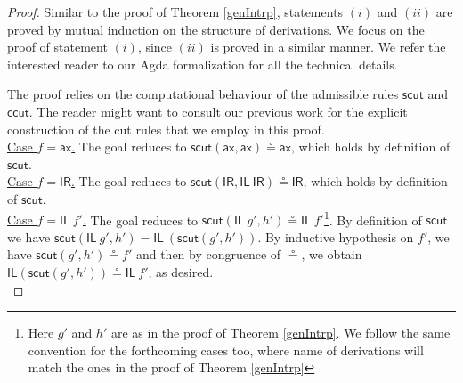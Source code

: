 \documentclass[sn-mathphys-num]{sn-jnl}%
\newcommand{\vd}{\vdash}
\newcommand{\unitl}{\mathsf{IL}}
\newcommand{\unitr}{\mathsf{IR}}
\newcommand{\ax}{\mathsf{ax}}
\newcommand{\mf}[1]{\mathsf{#1}}
\newcommand{\scut}[2]{\mf{scut} (#1 , #2)}
\theoremstyle{thmstyleone}%
\theoremstyle{thmstyletwo}%
\theoremstyle{thmstylethree}%
\begin{document}
\cutIntrp
\begin{proof}
  Similar to the proof of Theorem \ref{genIntrp}, statements $(i)$ and $(ii)$ are proved by mutual induction on the structure of derivations.
  We focus on the proof of statement $(i)$, since $(ii)$ is proved in a similar manner. We refer the interested reader to our Agda formalization for all the technical details.

  The proof relies on the computational behaviour of the admissible rules $\mf{scut}$ and $\mf{ccut}$. The reader might want to consult our previous work \cite{uustalu:sequent:2021,wan2024} for the explicit construction of the cut rules that we employ in this proof. \\
  \underline{Case $f = \ax$.} The goal reduces to $\mf{scut} (\ax , \ax) \circeq \ax$, which holds by definition of $\mf{scut}$.
  \\
  \underline{Case $f = \unitr$.} The goal reduces to $\mf{scut} (\unitr , \unitl\  \unitr) \circeq \unitr$, which holds by definition of $\mf{scut}$. %
  \\
  \underline{Case $f = \unitl \ f'$.} The goal reduces to $\mf{scut} (\unitl \ g', h') \circeq \unitl\ f'$\footnote{Here $g'$ and $h'$ are as in the proof of Theorem \ref{genIntrp}. We follow the same convention for the forthcoming cases too, where name of derivations will match the ones in the proof of Theorem \ref{genIntrp}}. By definition of $\mf{scut}$ we have $\mf{scut} (\unitl \ g', h') = \unitl\ (\mf{scut} (g', h'))$. By inductive hypothesis on $f'$, we have $\mf{scut} (g' , h') \circeq f'$ and then by congruence of $\circeq$, we obtain $\unitl (\scut{g'}{h'}) \circeq \unitl\ f'$, as desired.
  \\

\end{proof}
\end{document}
